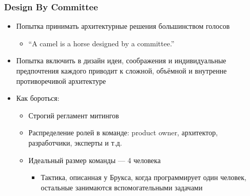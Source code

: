 \documentclass[xetex,mathserif,serif]{beamer}
\begin{document}
	\begin{frame}
		\frametitle{Design By Committee}
		\begin{itemize}
			\item Попытка принимать архитектурные решения большинством голосов
			\begin{itemize}
				\item ``A camel is a horse designed by a committee.''
			\end{itemize}
			\item Попытка включить в дизайн идеи, соображения и индивидуальные предпочтения каждого приводит к сложной, объёмной и внутренне противоречивой архитектуре
			\item Как бороться:
			\begin{itemize}
				\item Строгий регламент митингов
				\item Распределение ролей в команде: product owner, архитектор, разработчики, эксперты и т.д.
				\item Идеальный размер команды --- 4 человека
				\begin{itemize}
					\item Тактика, описанная у Брукса, когда программирует один человек, остальные занимаются вспомогательными задачами
				\end{itemize}
			\end{itemize}
		\end{itemize}
	\end{frame}
\end{document}

